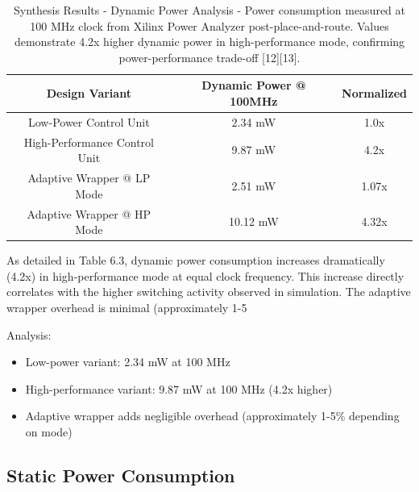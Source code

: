 \documentclass[15pt,a4paper]{report}
\begin{document}
\begin{table}[H]
    \centering
    \begin{tabular}{|c|c|c|}
        \hline
        \textbf{Design Variant} & \textbf{Dynamic Power @ 100MHz} & \textbf{Normalized} \\
        \hline
        Low-Power Control Unit & 2.34 mW & 1.0x \\
        \hline
        High-Performance Control Unit & 9.87 mW & 4.2x \\
        \hline
        Adaptive Wrapper @ LP Mode & 2.51 mW & 1.07x \\
        \hline
        Adaptive Wrapper @ HP Mode & 10.12 mW & 4.32x \\
        \hline
    \end{tabular}
    \label{tab:power_dyn}
    \caption{Synthesis Results - Dynamic Power Analysis - Power consumption measured at 100 MHz clock from Xilinx Power Analyzer post-place-and-route. Values demonstrate 4.2x higher dynamic power in high-performance mode, confirming power-performance trade-off [12][13].}
\end{table}

As detailed in Table 6.3, dynamic power consumption increases dramatically (4.2x) in high-performance mode at equal clock frequency. This increase directly correlates with the higher switching activity observed in simulation. The adaptive wrapper overhead is minimal (approximately 1-5%

Analysis:
\begin{itemize}
    \item Low-power variant: 2.34 mW at 100 MHz
    \item High-performance variant: 9.87 mW at 100 MHz (4.2x higher)
    \item Adaptive wrapper adds negligible overhead (approximately 1-5\% depending on mode)
\end{itemize}

\subsection{Static Power Consumption}
\end{document}
